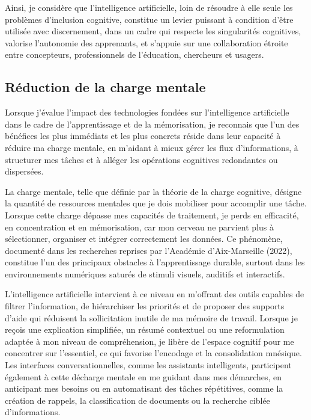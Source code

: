 \documentclass[11pt,a4paper]{report}
\begin{document}
Ainsi, je considère que l’intelligence artificielle, loin de résoudre à elle seule les problèmes d’inclusion cognitive, constitue un levier puissant à condition d’être utilisée avec discernement, dans un cadre qui respecte les singularités cognitives, valorise l’autonomie des apprenants, et s’appuie sur une collaboration étroite entre concepteurs, professionnels de l’éducation, chercheurs et usagers.

\subsection{Réduction de la charge mentale}

Lorsque j’évalue l’impact des technologies fondées sur l’intelligence artificielle dans le cadre de l’apprentissage et de la mémorisation, je reconnais que l’un des bénéfices les plus immédiats et les plus concrets réside dans leur capacité à réduire ma charge mentale, en m’aidant à mieux gérer les flux d’informations, à structurer mes tâches et à alléger les opérations cognitives redondantes ou dispersées.

La charge mentale, telle que définie par la théorie de la charge cognitive, désigne la quantité de ressources mentales que je dois mobiliser pour accomplir une tâche. Lorsque cette charge dépasse mes capacités de traitement, je perds en efficacité, en concentration et en mémorisation, car mon cerveau ne parvient plus à sélectionner, organiser et intégrer correctement les données. Ce phénomène, documenté dans les recherches reprises par l’Académie d’Aix-Marseille (2022), constitue l’un des principaux obstacles à l’apprentissage durable, surtout dans les environnements numériques saturés de stimuli visuels, auditifs et interactifs.

L’intelligence artificielle intervient à ce niveau en m’offrant des outils capables de filtrer l’information, de hiérarchiser les priorités et de proposer des supports d’aide qui réduisent la sollicitation inutile de ma mémoire de travail. Lorsque je reçois une explication simplifiée, un résumé contextuel ou une reformulation adaptée à mon niveau de compréhension, je libère de l’espace cognitif pour me concentrer sur l’essentiel, ce qui favorise l’encodage et la consolidation mnésique. Les interfaces conversationnelles, comme les assistants intelligents, participent également à cette décharge mentale en me guidant dans mes démarches, en anticipant mes besoins ou en automatisant des tâches répétitives, comme la création de rappels, la classification de documents ou la recherche ciblée d’informations.
\end{document}
